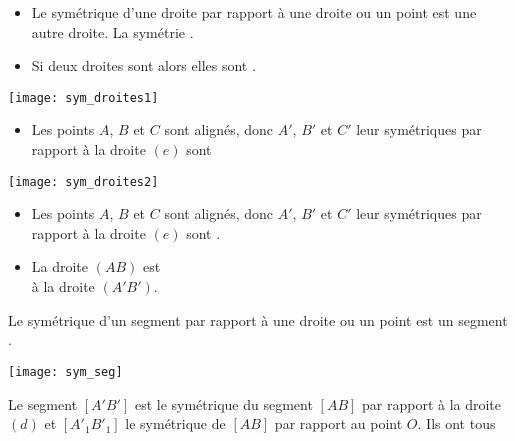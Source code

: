 \begin{myprops}
	\begin{itemize}
		\item Le symétrique d'une droite par rapport à une droite ou un point est une autre droite. La symétrie \hspace*{6cm}.
		\item Si deux droites sont  alors elles sont \hspace*{4cm}.
	\end{itemize}
\end{myprops}

\begin{myexs}
	\begin{multicols}{2}
		\begin{center}
			\texttt{[image: sym\_droites1]}
		\end{center}

		\begin{itemize}
			\item Les points $A$, $B$ et $C$ sont alignés, donc $A'$, $B'$ et $C'$ leur symétriques par rapport à la droite $(e)$ sont \hspace*{6cm}
		\end{itemize}	
		
		\begin{center}
			\texttt{[image: sym\_droites2]}
		\end{center}
	
		\begin{itemize}
			\item Les points $A$, $B$ et $C$ sont alignés, donc $A'$, $B'$ et $C'$ leur symétriques par rapport à la droite $(e)$ sont \hspace*{6cm}.
			\item La droite $(AB)$ est \hspace*{4cm} \\ à la droite $(A'B')$.
		\end{itemize}
	\end{multicols}
\end{myexs}

\begin{myprop}
	Le symétrique d'un segment par rapport à une droite ou un point est un segment \hspace*{6cm} .
\end{myprop}

\begin{myex}
	\begin{center}
		\texttt{[image: sym\_seg]}
	\end{center}

Le segment $[A'B']$ est le symétrique du segment $[AB]$ par rapport à la droite $(d)$ et $[A'_1B'_1]$ le symétrique de $[AB]$ par rapport au point $O$. 
Ils ont tous \\

	
\end{myex}

